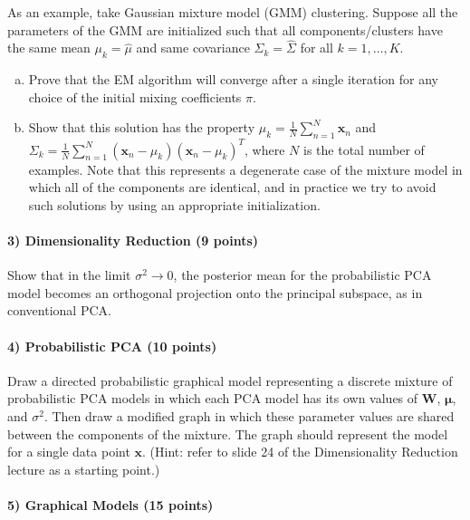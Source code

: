 \documentclass[11pt]{article}
\begin{document}
As an example, take Gaussian mixture model (GMM) clustering. Suppose all the parameters of the GMM are initialized such that all components/clusters have the same mean $\mu_k=\hat{\mu}$ and same covariance $\Sigma_k=\hat{\Sigma}$ for all $k=1,\ldots,K$.
\begin{enumerate}[(a)]
\item Prove that the EM
algorithm will converge after a single iteration for any choice of the initial mixing coefficients $\pi$.
\item Show that this solution has the property $\mu_k=\frac{1}{N}\sum_{n=1}^{N}\mathbf{x}_n$ and $\Sigma_k=\frac{1}{N}\sum_{n=1}^{N}(\mathbf{x}_n-\mu_k)(\mathbf{x}_n-\mu_k)^T$, where $N$ is the total number of examples. Note that this represents a degenerate case of the mixture model in which all of the components are identical, and in practice we try to avoid such solutions by using an appropriate initialization.
\end{enumerate}

\paragraph{3) Dimensionality Reduction (9 points)}

Show that in the limit $\sigma^2 \rightarrow 0$, the posterior mean for the probabilistic PCA model becomes an orthogonal projection onto the principal subspace, as in conventional PCA.
	

\paragraph{4) Probabilistic PCA (10 points)}

Draw a directed probabilistic graphical model representing a discrete mixture of probabilistic PCA models in which each PCA model has its own values of $\mathbf{W}$, $\boldsymbol{\mu}$, and $\sigma^2$. Then draw a modified graph in which these parameter values are shared between the components of the mixture. The graph should represent the model for a single data point $\mathbf{x}$. (Hint: refer to slide 24 of the Dimensionality Reduction lecture as a starting point.)
	

\paragraph{5) Graphical Models (15 points)}
	
\end{document}
